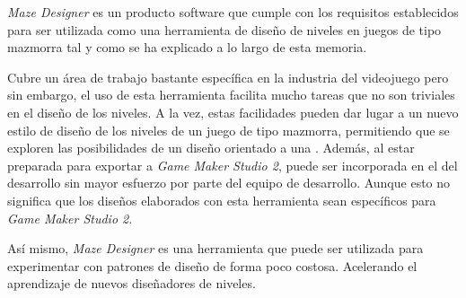\textit{Maze Designer} es un producto software que cumple con los requisitos establecidos para ser utilizada como una herramienta de diseño de niveles en juegos de tipo mazmorra tal y como se ha explicado a lo largo de esta memoria.

Cubre un área de trabajo bastante específica en la industria del videojuego pero sin embargo, el uso de esta herramienta facilita mucho tareas que no son triviales en el diseño de los niveles. A la vez, estas facilidades pueden dar lugar a un nuevo estilo de diseño de los niveles de un juego de tipo mazmorra, permitiendo que se exploren las posibilidades de un diseño orientado a una .
Además, al estar preparada para exportar a \textit{Game Maker Studio 2}, puede ser incorporada en el  del desarrollo sin mayor esfuerzo por parte del equipo de desarrollo. Aunque esto no significa que los diseños elaborados con esta herramienta sean específicos para \textit{Game Maker Studio 2}.

Así mismo, \textit{Maze Designer} es una herramienta que puede ser utilizada para experimentar con patrones de diseño de forma poco costosa. Acelerando el aprendizaje de nuevos diseñadores de niveles.